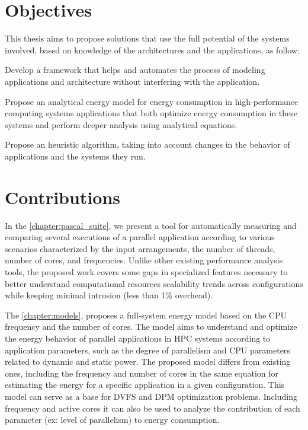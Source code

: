 \section{Objectives} \label{sec:objectives}
This thesis aims to propose solutions that use the full potential of the systems involved, based on knowledge of the architectures and the applications, as follow:

Develop a framework that helps and automates the process of modeling applications and architecture without interfering with the application.

Propose an analytical energy model for energy consumption in high-performance computing systems applications that both optimize energy consumption in these systems and perform deeper analysis using analytical equations.

Propose an heuristic algorithm, taking into account changes in the behavior of applications and the systems they run.

\section{Contributions} \label{sec:contributions}

In the \cref{chapter:pascal_suite}, we present a tool for automatically measuring and comparing several executions of a parallel application according to various scenarios characterized by the input arrangements, the number of threads, number of cores, and frequencies. Unlike other existing performance analysis tools, the proposed work covers some gaps in specialized features necessary to better understand computational resources scalability trends across configurations while keeping minimal intrusion (less than 1\% overhead).

The \cref{chapter:models}, proposes a full-system energy model based on the CPU frequency and the number of cores. The model aims to understand and optimize the energy behavior of parallel applications in HPC systems according to application parameters, such as the degree of parallelism and CPU parameters related to dynamic and static power. The proposed model differs from existing ones, including the frequency and number of cores in the same equation for estimating the energy for a specific application in a given configuration. This model can serve as a base for DVFS and DPM optimization problems. Including frequency and active cores it can also be used to analyze the contribution of each parameter (ex: level of parallelism) to energy consumption.

